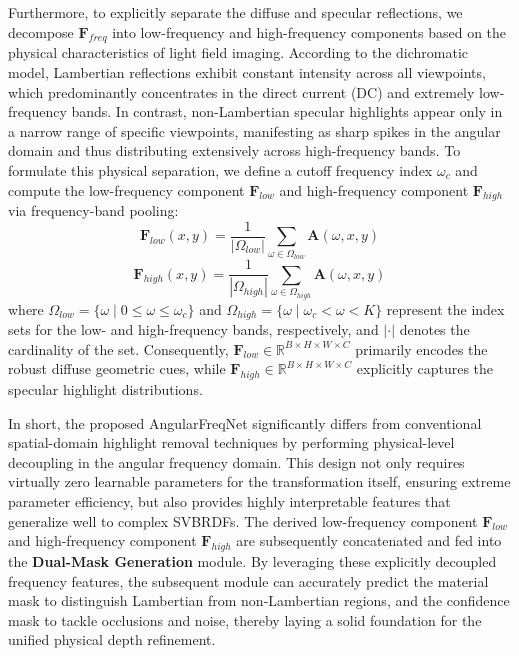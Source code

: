 \documentclass[lettersize,journal]{IEEEtran}
\begin{document}
Furthermore, to explicitly separate the diffuse and specular reflections, we decompose $\mathbf{F}_{freq}$ into low-frequency and high-frequency components based on the physical characteristics of light field imaging. According to the dichromatic model, Lambertian reflections exhibit constant intensity across all viewpoints, which predominantly concentrates in the direct current (DC) and extremely low-frequency bands. In contrast, non-Lambertian specular highlights appear only in a narrow range of specific viewpoints, manifesting as sharp spikes in the angular domain and thus distributing extensively across high-frequency bands. To formulate this physical separation, we define a cutoff frequency index $\omega_c$ and compute the low-frequency component $\mathbf{F}_{low}$ and high-frequency component $\mathbf{F}_{high}$ via frequency-band pooling:
\begin{equation}
\label{eq:eq8}
\mathbf{F}_{low}(x, y) = \frac{1}{|\Omega_{low}|} \sum_{\omega \in \Omega_{low}} \mathbf{A}(\omega, x, y)
\end{equation}
\begin{equation}
\label{eq:eq9}
\mathbf{F}_{high}(x, y) = \frac{1}{|\Omega_{high}|} \sum_{\omega \in \Omega_{high}} \mathbf{A}(\omega, x, y)
\end{equation}
where $\Omega_{low} = \{\omega \mid 0 \le \omega \le \omega_c\}$ and $\Omega_{high} = \{\omega \mid \omega_c < \omega < K\}$ represent the index sets for the low- and high-frequency bands, respectively, and $|\cdot|$ denotes the cardinality of the set. Consequently, $\mathbf{F}_{low} \in \mathbb{R}^{B \times H \times W \times C}$ primarily encodes the robust diffuse geometric cues, while $\mathbf{F}_{high} \in \mathbb{R}^{B \times H \times W \times C}$ explicitly captures the specular highlight distributions.

In short, the proposed AngularFreqNet significantly differs from conventional spatial-domain highlight removal techniques by performing physical-level decoupling in the angular frequency domain. This design not only requires virtually zero learnable parameters for the transformation itself, ensuring extreme parameter efficiency, but also provides highly interpretable features that generalize well to complex SVBRDFs. The derived low-frequency component $\mathbf{F}_{low}$ and high-frequency component $\mathbf{F}_{high}$ are subsequently concatenated and fed into the \textbf{Dual-Mask Generation} module. By leveraging these explicitly decoupled frequency features, the subsequent module can accurately predict the material mask to distinguish Lambertian from non-Lambertian regions, and the confidence mask to tackle occlusions and noise, thereby laying a solid foundation for the unified physical depth refinement.
\end{document}
